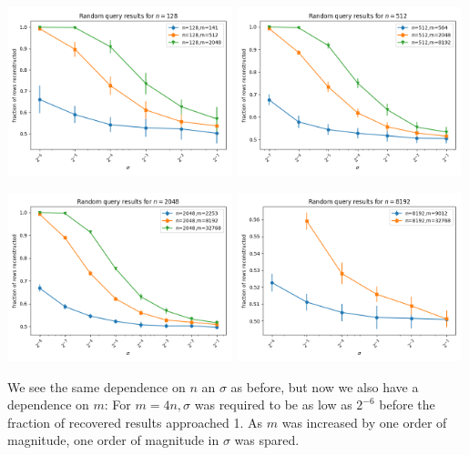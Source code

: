 \begin{center}
    \includegraphics[width=0.49\textwidth]{random_graph_n128.png}
    \includegraphics[width=0.49\textwidth]{random_graph_n512.png}

    \includegraphics[width=0.49\textwidth]{random_graph_n2048.png}
    \includegraphics[width=0.49\textwidth]{random_graph_n8192.png}
\end{center}

We see the same dependence on $n$ an $\sigma$ as before, but now we also have a dependence on $m$: For $m=4n, \sigma$
was required to be as low as $2^{-6}$ before the fraction of recovered results approached 1.  As $m$ was increased by
one order of magnitude, one order of magnitude in $\sigma$ was spared.
%
